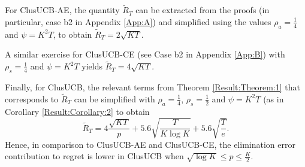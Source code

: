 For ClusUCB-AE, the quantity $\tilde R_T$ can be extracted from the proofs (in particular, case b2 in Appendix \ref{App:A}) 
and simplified using the values $\rho_{a}=\frac{1}{4}$ and $\psi=K^{2}T$, to obtain $\tilde R_T = 2\sqrt{KT}$. 

A similar exercise for ClusUCB-CE (see Case b2 in Appendix \ref{App:B}) 
with $\rho_{s}=\frac{1}{4}$ and $\psi=K^{2}T$ yields $\tilde R_T = 4\sqrt{KT}$. 

Finally, for ClusUCB, the relevant terms from Theorem \ref{Result:Theorem:1} that corresponds to $\tilde R_T$ 
can be simplified with $\rho_{a}=\frac{1}{4}$, $\rho_{s}=\frac{1}{2}$ and $\psi=K^{2}T$ (as in Corollary \ref{Result:Corollary:2} to obtain  
$$\tilde R_T = 4\dfrac{\sqrt{KT}}{p} + 5.6\sqrt{\dfrac{T}{K\log K}} + 5.6\sqrt{\dfrac{T}{e}}.$$ 
Hence, in comparison to ClusUCB-AE and ClusUCB-CE, the elimination error contribution to regret is lower in ClusUCB when $\sqrt{\log K}\leq p\leq \frac{K}{2}$. 
 
